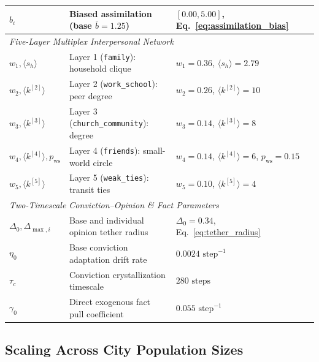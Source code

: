 \begin{table}[htbp]
\begin{tabular}{lp{5.1cm}p{3.6cm}p{3.8cm}}
$b_i$ & Biased assimilation (base $\bar{b}=1.25$) & $[0.00, 5.00]$, Eq.~\eqref{eq:assimilation_bias} & \citet{lord1979biased, dandekar2013biased} \\
\midrule
\multicolumn{4}{l}{\textit{Five-Layer Multiplex Interpersonal Network}} \\
$w_1, \langle s_h \rangle$ & Layer 1 (\texttt{family}): household clique & $w_1 = 0.36$, $\langle s_h \rangle = 2.79$ & \citet{ibge2022censo} \\
$w_2, \langle k^{[2]} \rangle$ & Layer 2 (\texttt{work\_school}): peer degree & $w_2 = 0.26$, $\langle k^{[2]} \rangle = 10$ & \citet{inep2023censo, mte2023rais} \\
$w_3, \langle k^{[3]} \rangle$ & Layer 3 (\texttt{church\_community}): degree & $w_3 = 0.14$, $\langle k^{[3]} \rangle = 8$ & \citet{mcpherson2001birds} \\
$w_4, \langle k^{[4]} \rangle, p_{\mathrm{ws}}$ & Layer 4 (\texttt{friends}): small-world circle & $w_4 = 0.14$, $\langle k^{[4]} \rangle = 6$, $p_{\mathrm{ws}}=0.15$ & \citet{watts1998collective} \\
$w_5, \langle k^{[5]} \rangle$ & Layer 5 (\texttt{weak\_ties}): transit ties & $w_5 = 0.10$, $\langle k^{[5]} \rangle = 4$ & \citet{granovetter1973strength, ibge2022censo} \\
\midrule
\multicolumn{4}{l}{\textit{Two-Timescale Conviction--Opinion \& Fact Parameters}} \\
$\Delta_0, \Delta_{\max, i}$ & Base and individual opinion tether radius & $\Delta_0 = 0.34$, Eq.~\eqref{eq:tether_radius} & \citet{sherif1961social, howe2017attitude} \\
$\eta_0$ & Base conviction adaptation drift rate & $0.0024 \text{ step}^{-1}$ & \citet{kiley2020measuring} \\
$\tau_c$ & Conviction crystallization timescale & $280 \text{ steps}$ & \citet{alwin1991aging} \\
$\gamma_0$ & Direct exogenous fact pull coefficient & $0.055 \text{ step}^{-1}$ & \citet{mullainathan2005market, zaller1992nature} \\
\bottomrule
\end{tabular}
\end{table}

\subsection{Scaling Across City Population Sizes}
\label{subsec:city_scaling}

